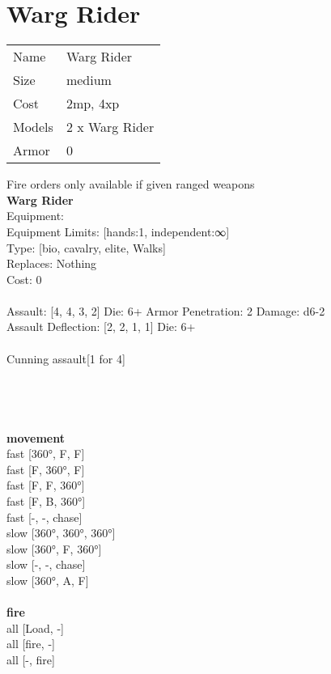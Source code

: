 \pagebreak\pagebreak

\section{ Warg Rider }

\begin{tabular}{ll}
  Name & Warg Rider \\
  Size & medium\\
  Cost & 2mp, 4xp\\
  Models & 2 x Warg Rider\\
  Armor & 0\\
\end{tabular}

\noindent Fire orders only available if given ranged weapons\\ 


{\bf Warg Rider } \\
Equipment:  \\
Equipment Limits: [hands:1, independent:∞] \\
Type: [bio, cavalry, elite, Walks] \\
Replaces: Nothing \\
Cost: 0\\
\ \\
Assault: [4, 4, 3, 2] Die: 6+ Armor Penetration: 2 Damage: d6-2 \\
Assault Deflection: [2, 2, 1, 1] Die: 6+\\
\\ 
Cunning assault[1 for 4]\\ 
 
\ \\

\ \\
 
\ \\



\ \\ {\bf movement } \\
fast [360°, F, F] \\
fast [F, 360°, F] \\
fast [F, F, 360°] \\
fast [F, B, 360°] \\
fast [-, -, chase] \\
slow [360°, 360°, 360°] \\
slow [360°, F, 360°] \\
slow [-, -, chase] \\
slow [360°, A, F] \\
\ \\ {\bf fire } \\
all [Load, -] \\
all [fire, -] \\
all [-, fire] \\



